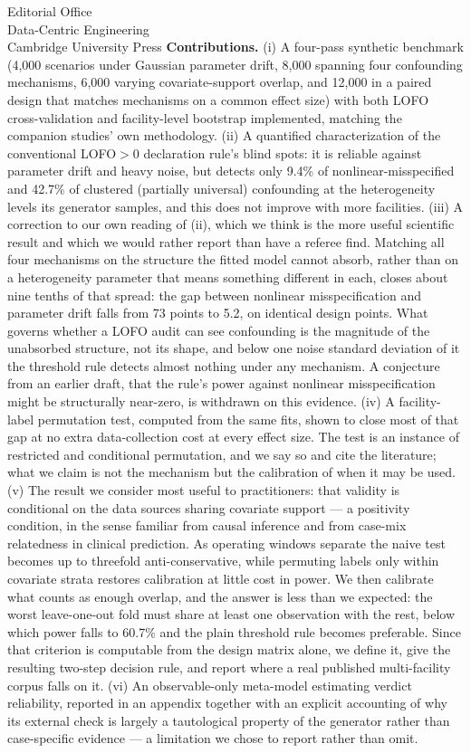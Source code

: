 \documentclass[12pt,a4paper]{letter}
\begin{document}
\begin{letter}{Editorial Office\\Data-Centric Engineering\\Cambridge University Press}
\textbf{Contributions.} (i) A four-pass synthetic benchmark (4,000 scenarios under Gaussian parameter drift, 8,000 spanning four confounding mechanisms, 6,000 varying covariate-support overlap, and 12,000 in a paired design that matches mechanisms on a common effect size) with both LOFO cross-validation and facility-level bootstrap implemented, matching the companion studies' own methodology. (ii) A quantified characterization of the conventional LOFO$>0$ declaration rule's blind spots: it is reliable against parameter drift and heavy noise, but detects only 9.4\% of nonlinear-misspecified and 42.7\% of clustered (partially universal) confounding at the heterogeneity levels its generator samples, and this does not improve with more facilities. (iii) A correction to our own reading of (ii), which we think is the more useful scientific result and which we would rather report than have a referee find. Matching all four mechanisms on the structure the fitted model cannot absorb, rather than on a heterogeneity parameter that means something different in each, closes about nine tenths of that spread: the gap between nonlinear misspecification and parameter drift falls from 73 points to 5.2, on identical design points. What governs whether a LOFO audit can see confounding is the magnitude of the unabsorbed structure, not its shape, and below one noise standard deviation of it the threshold rule detects almost nothing under any mechanism. A conjecture from an earlier draft, that the rule's power against nonlinear misspecification might be structurally near-zero, is withdrawn on this evidence. (iv) A facility-label permutation test, computed from the same fits, shown to close most of that gap at no extra data-collection cost at every effect size. The test is an instance of restricted and conditional permutation, and we say so and cite the literature; what we claim is not the mechanism but the calibration of when it may be used. (v) The result we consider most useful to practitioners: that validity is conditional on the data sources sharing covariate support --- a positivity condition, in the sense familiar from causal inference and from case-mix relatedness in clinical prediction. As operating windows separate the naive test becomes up to threefold anti-conservative, while permuting labels only within covariate strata restores calibration at little cost in power. We then calibrate what counts as enough overlap, and the answer is less than we expected: the worst leave-one-out fold must share at least one observation with the rest, below which power falls to 60.7\% and the plain threshold rule becomes preferable. Since that criterion is computable from the design matrix alone, we define it, give the resulting two-step decision rule, and report where a real published multi-facility corpus falls on it. (vi) An observable-only meta-model estimating verdict reliability, reported in an appendix together with an explicit accounting of why its external check is largely a tautological property of the generator rather than case-specific evidence --- a limitation we chose to report rather than omit.


\end{letter}
\end{document}
